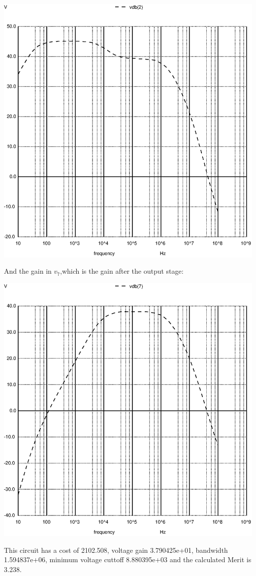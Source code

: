 \includegraphics[width=1\linewidth]{../sim/vo1f.ps}

And the gain in $v_7$,which is the gain after the output stage:

\includegraphics[width=1\linewidth]{../sim/vo2f.ps}

\par


This circuit has a cost of 2102.508, voltage gain 3.790425e+01, bandwidth 1.594837e+06, minimum voltage cuttoff 8.880395e+03 and the  calculated Merit is 3.238.